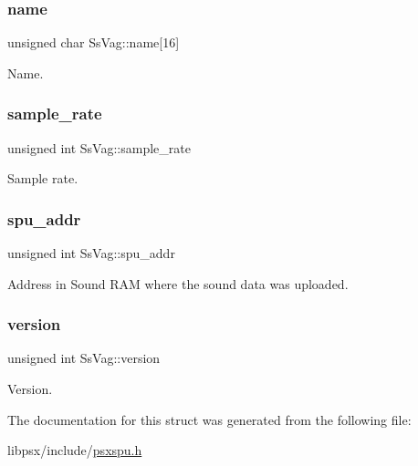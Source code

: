 \subsubsection{\texorpdfstring{name}{name}}
{\footnotesize\ttfamily unsigned char Ss\+Vag\+::name\mbox{[}16\mbox{]}}



Name. 

\mbox{\label{structSsVag_adf52d04265b92a1aa68b63ed235cfdfa}} 
\subsubsection{\texorpdfstring{sample\+\_\+rate}{sample\_rate}}
{\footnotesize\ttfamily unsigned int Ss\+Vag\+::sample\+\_\+rate}



Sample rate. 

\mbox{\label{structSsVag_a69eb2b0fb6383829e4e148dd1be8bdde}} 
\subsubsection{\texorpdfstring{spu\+\_\+addr}{spu\_addr}}
{\footnotesize\ttfamily unsigned int Ss\+Vag\+::spu\+\_\+addr}



Address in Sound R\+AM where the sound data was uploaded. 

\mbox{\label{structSsVag_ad9ab18aa60cbf2641b770dfc0a51d2dc}} 
\subsubsection{\texorpdfstring{version}{version}}
{\footnotesize\ttfamily unsigned int Ss\+Vag\+::version}



Version. 



The documentation for this struct was generated from the following file\+:\begin{DoxyCompactItemize}
\item 
libpsx/include/\hyperlink{psxspu_8h}{psxspu.\+h}\end{DoxyCompactItemize}
